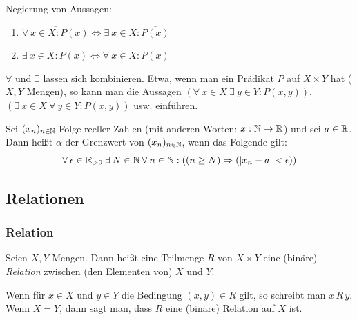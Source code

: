 \begin{bem}
	Negierung von Aussagen:
	\begin{enumerate}
		\item $ \overline{\forall\: x \in X : P(x)} \Leftrightarrow \exists\: x \in X : \overline{P(x)} $
		\item $ \overline{\exists\: x \in X : P(x)} \Leftrightarrow \forall\: x \in X : \overline{P(x)} $
	\end{enumerate}
\end{bem}

\begin{bem}
	$ \forall $ und $ \exists $ lassen sich kombinieren. Etwa, wenn man ein Prädikat $ P $ auf $ X \times Y $ hat ($ X,Y $ Mengen), so kann man die Aussagen $ \left( \forall\: x \in X \:\exists\: y \in Y : P(x,y) \right) $, $ \left( \exists\: x \in X \:\forall\: y \in Y : P(x,y) \right) $ usw. einführen.
\end{bem}

\begin{bsp}
	Sei $ (x_n)_{n \in \mathbb N} $ Folge reeller Zahlen (mit anderen Worten: $ x : \mathbb N \to \mathbb R $) und sei $ a\in \mathbb R $. Dann heißt $ \alpha $ der Grenzwert von $ (x_n)_{n \in \mathbb N} $, wenn das Folgende gilt:
	\begin{equation*}
		\forall\: \epsilon \in \mathbb R_{>0} \:\exists\: N \in \mathbb N \:\forall\: n \in \mathbb N: \left( (n \geq N) \Rightarrow (|x_n - a| < \epsilon) \right)
	\end{equation*}
\end{bsp} 

\clearpage
\subsection{Relationen}

\subsubsection{Relation}

Seien $ X,Y $ Mengen. Dann heißt eine Teilmenge $ R $ von $ X \times Y $ eine (binäre) \emph{Relation} zwischen (den Elementen von) $ X $ und $ Y $.

Wenn für $ x \in X $ und $ y \in Y $ die Bedingung $ (x,y) \in R $ gilt, so schreibt man $ x \, R \, y $. Wenn $ X = Y $, dann sagt man, dass $ R $ eine (binäre) Relation auf $ X $ ist.

